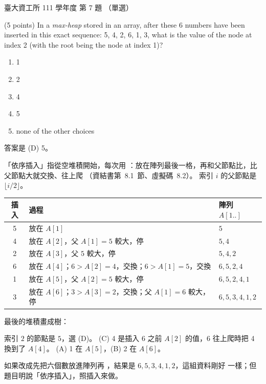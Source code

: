 \begin{pastexam}[label={px:ntu-111-dsaa-07}]{臺大資工所 111 學年度 第 7 題}
（單選）

(5 points) In a \textit{max-heap} stored in an array, after these 6 numbers have been inserted in this
exact sequence: 5, 4, 2, 6, 1, 3, what is the value of the node at index 2 (with the root being
the node at index 1)?
\begin{enumerate}[label=(\Alph*)]
\item 1
\item 2
\item 4
\item 5
\item none of the other choices
\end{enumerate}
\end{pastexam}

\begin{pastsoln}
答案是 (D) 5。

「依序插入」指從空堆積開始，每次用
：放在陣列最後一格，再和父節點比，比父節點大就交換、往上爬
（資結書第~8.1~節、虛擬碼~8.2）。 索引 $i$ 的父節點是 $\lfloor i/2 \rfloor$。
\begin{center}
\begin{tabular}{cll}
\toprule
插入 & 過程 & 陣列 $A[1..]$ \\
\midrule
5 & 放在 $A[1]$ & $5$ \\
4 & 放在 $A[2]$，父 $A[1] = 5$ 較大，停 & $5, 4$ \\
2 & 放在 $A[3]$，父 $5$ 較大，停 & $5, 4, 2$ \\
6 & 放在 $A[4]$；$6 > A[2] = 4$，交換；$6 > A[1] = 5$，交換 & $6, 5, 2, 4$ \\
1 & 放在 $A[5]$，父 $A[2] = 5$ 較大，停 & $6, 5, 2, 4, 1$ \\
3 & 放在 $A[6]$；$3 > A[3] = 2$，交換；父 $A[1] = 6$ 較大，停 & $6, 5, 3, 4, 1, 2$ \\
\bottomrule
\end{tabular}
\end{center}
最後的堆積畫成樹：
\begin{center}
\end{center}
索引 $2$ 的節點是 $5$，選 (D)。 (C) 4 是插入 6 之前 $A[2]$ 的值，6 往上爬時把 4 換到了 $A[4]$。
(A) 1 在 $A[5]$，(B) 2 在 $A[6]$。

如果改成先把六個數放進陣列再 ，結果是 $6, 5, 3, 4, 1, 2$，這組資料剛好
一樣；但題目明說「依序插入」，照插入來做。
\end{pastsoln}
